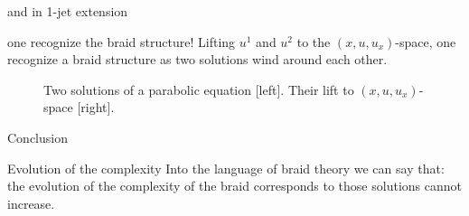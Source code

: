 \documentclass[9pt, english]{beamer}
\theoremstyle{definition}
\begin{document}
\begin{frame}{and in 1-jet extension}
    \begin{block}{one recognize the braid structure!}
        Lifting $u^1$ and $u^2$ to the $(x,u, u_x)$-space, one recognize
        a braid structure as two solutions wind around each other.
        \begin{figure}\label{fig:lift}
        \caption{Two solutions of a parabolic equation [left]. Their lift to
        $(x,u,u_x)$-space [right].}
        \end{figure}
    \end{block}
\end{frame}
\begin{frame}{Conclusion}
    \begin{block}{Evolution of the complexity}
        Into the language of braid theory we can say that:\pause\\
        {\color{green}
        {the evolution of the complexity of the braid corresponds to
        those solutions cannot increase.}\/}
    \end{block}
\end{frame}
\end{document}
